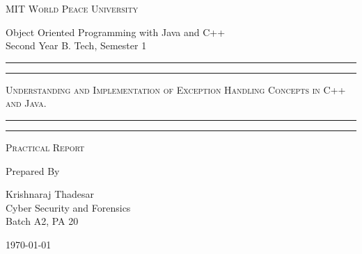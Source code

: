 \documentclass[11pt]{article}
\begin{document}
\begin{titlepage}
	\centering


	\huge\textsc{
		MIT World Peace University
	}\\

	\vspace{0.75\baselineskip} %

	\LARGE{
		Object Oriented Programming with Java and C++\\
		Second Year B. Tech, Semester 1
	}

	\vfill %


	\rule{\textwidth}{1.6pt}\vspace*{-\baselineskip}\vspace*{2pt}
	\rule{\textwidth}{0.6pt}
	\vspace{0.75\baselineskip} %



	\huge{\textsc{
			Understanding and Implementation of Exception Handling Concepts in C++ and Java.
		}} \\



	\vspace{0.5\baselineskip} %
	\rule{\textwidth}{0.6pt}\vspace*{-\baselineskip}\vspace*{2.8pt}
	\rule{\textwidth}{1.6pt}

	\vspace{1\baselineskip} %


	\LARGE\textsc{
		Practical Report
	} %
	\vfill


	Prepared By
	\vspace{0.5\baselineskip} %

	\Large{
		Krishnaraj Thadesar \\
		Cyber Security and Forensics\\
		Batch A2, PA 20
	}


	\vspace{0.5\baselineskip} %
	\today

\end{titlepage}
\end{document}
